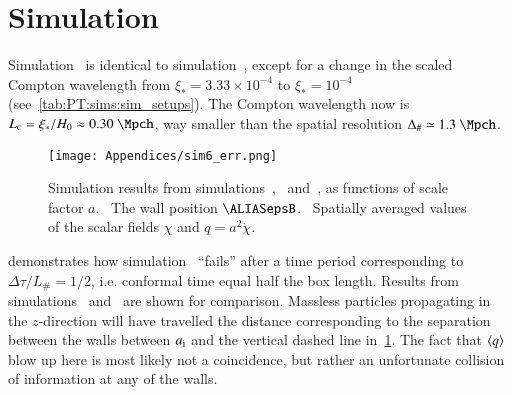 




\newcommand\Ft{\ALIASFt}
\newcommand\ah{\ALIASah}
\newcommand\lcoord{\ALIASlcoord}
\newcommand\lcoordx{\ALIASlcoordx}
\newcommand\lcoordk{\ALIASlcoordk}
\newcommand\hpA{\ALIAShpA}
\newcommand\hpB{\ALIAShpB}
\newcommand\hpC{\ALIAShpC}
\newcommand\hpAB{\ALIAShpAB}
\newcommand\hpCR{\ALIAShpCR}
\newcommand\hpCI{\ALIAShpCI}
\newcommand\epsA{\ALIASepsA}
\newcommand\epsB{\ALIASepsB}
\newcommand\epsC{\ALIASepsC}






\section{Simulation~}\label{app:misc:sim6}
    Simulation~ is identical to simulation~, except for a change in the scaled Compton wavelength from $\xi_\ast=3.33\times 10^{-4}$ to $\xi_\ast = 10^{-4}$ (see~\cref{tab:PT:sims:sim_setups}). %
    The Compton wavelength now is $L\nped{C} = \xi_\ast/H_0 \approx 0.30~\Mpch$, 
    way smaller than the spatial resolution $\Delta_\# \simeq 1.3~\Mpch$. %
    \begin{figure}[hb]
        \centering
        \texttt{[image: Appendices/sim6\_err.png]}
        \caption{Simulation results from simulations~,~ and~, as functions of scale factor $a$. ~The wall position $\epsB$. ~Spatially averaged values of the scalar fields $\chi$ and $q=a^2 \dot{\chi}$.}
        \label{fig:misc:sim6:sim6_err}
    \end{figure}%
     demonstrates how simulation~ ``fails'' after a time period corresponding to $\Delta \tau/L_\#= 1/2$, i.e. conformal time equal half the box length. Results from simulations~ and~ are shown for comparison. %
    Massless particles propagating in the $z$-direction will have travelled the distance corresponding to the separation between the walls between $a_\mathrm{i}$ and the vertical dashed line in~\cref{fig:misc:sim6:sim6_err}. The fact that $\left\langle{q}\right\rangle$ blow up here is most likely not a coincidence, but rather an unfortunate collision of information at any of the walls.  




